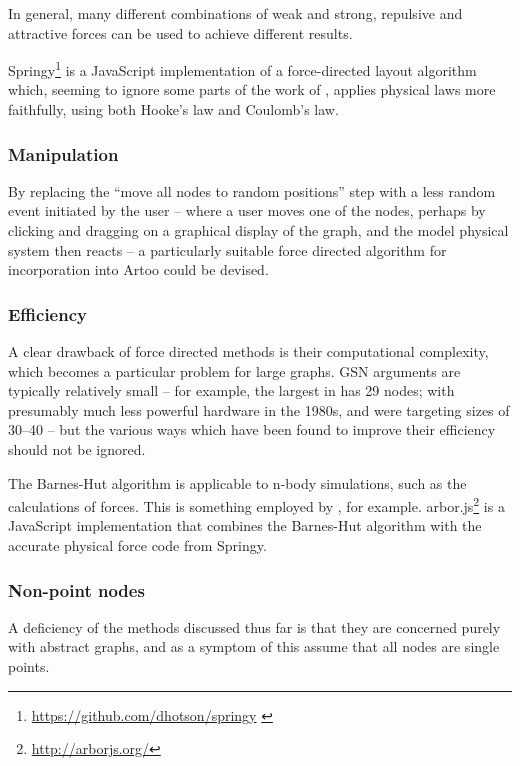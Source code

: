 In general, many different combinations of weak and strong, repulsive and attractive forces can be used to achieve different results.

Springy\footnote{\url{https://github.com/dhotson/springy} \label{fn:springy}} is a JavaScript implementation of a force-directed layout algorithm which, seeming to ignore some parts of the work of \citet{eades84}, applies physical laws more faithfully, using both Hooke's law and Coulomb's law.

\subsubsection{Manipulation}

By replacing the ``move all nodes to random positions'' step with a less random event initiated by the user -- where a user moves one of the nodes, perhaps by clicking and dragging on a graphical display of the graph, and the model physical system then reacts -- a particularly suitable force directed algorithm for incorporation into Artoo could be devised.

\subsubsection{Efficiency}

A clear drawback of force directed methods is their computational complexity, which becomes a particular problem for large graphs.
GSN arguments are typically relatively small -- for example, the largest in \cite{royal} has 29 nodes; with presumably much less powerful hardware in the 1980s, \citeauthor{eades84} and \citet{SPE:SPE4380211102} were targeting sizes of 30--40 --
but the various ways which have been found to improve their efficiency should not be ignored.

The Barnes-Hut algorithm is applicable to n-body simulations, such as the calculations of forces. This is something employed by \citet{quigleyfade}, for example. arbor.js\footnote{\url{http://arborjs.org/}} is a JavaScript implementation that combines the Barnes-Hut algorithm with the accurate physical force code from Springy.

\subsubsection{Non-point nodes}

A deficiency of the methods discussed thus far is that they are concerned purely with abstract graphs, and as a symptom of this assume that all nodes are single points. 


